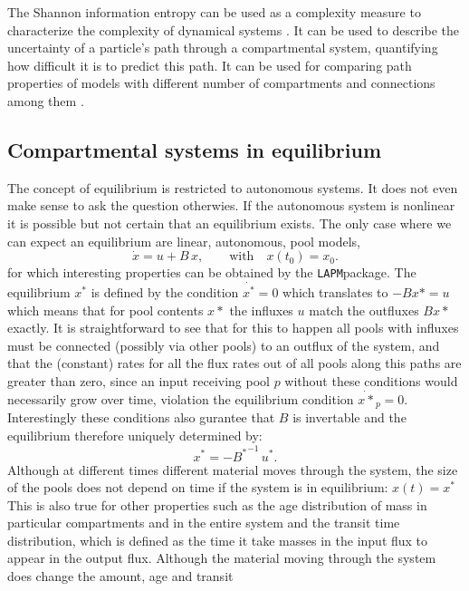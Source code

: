 \documentclass[a4paper]{article}
\newcommand{\LAPM}{\texttt{LAPM}}
\begin{document}
The Shannon information entropy can be used as a complexity measure  to characterize the complexity of dynamical systems \citep{Ebeling1998}.
It can be used to describe the uncertainty of a particle's path through a compartmental system, quantifying how difficult it is to predict this path. It can be used for comparing path properties of models with different number of compartments and connections among them \citep{Metzler2020}.

\subsection{Compartmental systems in equilibrium} \label{sec:Equilibrium}
The concept of equilibrium is restricted to autonomous systems. It does not even make sense to ask the question otherwies. 
If the autonomous system is nonlinear it is possible but not certain that an
equilibrium exists. The only case where we can expect an equilibrium are
linear, autonomous, pool models, 
\begin{equation} \label{eq:LS}
\dot{x} = u + B \, x, \qquad  \mathrm{with} \quad x(t_0) = x_0.
\end{equation}
for which interesting properties can be
obtained by the \LAPM package.  The equilibrium $x^*$ is defined by the
condition  $\dot{x^*}=0$ which translates to $-B x*=u$ which means that for
pool contents $x*$ the influxes $u$ match the outfluxes $B x*$ exactly.  It is
straightforward to see that for this to happen all 
pools with influxes must be connected (possibly via other pools) to an outflux of
the system, and that the (constant) rates for all the flux rates out of all
pools along this paths are greater than zero, since an input receiving pool $p$
without these conditions would necessarily grow over time, violation the
equilibrium condition $\dot{x*}_p=0$. Interestingly these conditions also
gurantee that $B$ is invertable and the equilibrium therefore uniquely
determined by: 
\begin{equation} 
x^* = - {B^*}^{-1} \, u^*.  
\end{equation}
Although at different times different material moves through the system, the
size of the pools does not depend on time if the system is in
equilibrium: $x(t)=x^*$ 
This is also true for other properties such as the
age distribution of mass in particular compartments and in the entire system
and the transit time distribution, which is defined as the time it take masses
in the input flux to appear in the output flux.  Although the material moving
through the system does change the amount, age and transit
\end{document}
